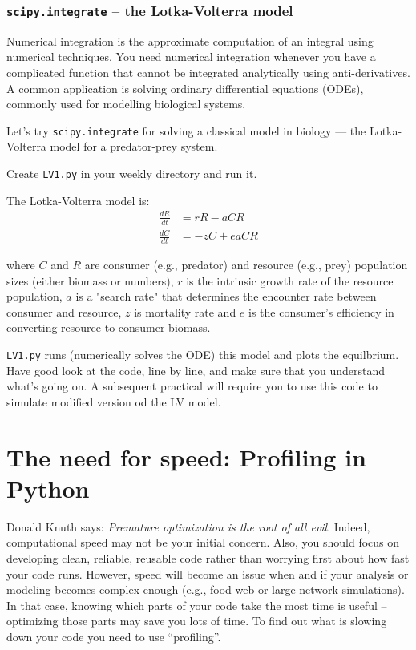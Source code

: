 \subsubsection{{\tt scipy.integrate} -- the Lotka-Volterra model} 
Numerical integration is the approximate computation of an integral 
using numerical techniques. You need numerical integration whenever you 
have a complicated function that cannot be integrated analytically 
using anti-derivatives. A common application is solving ordinary 
differential equations (ODEs), commonly used for modelling biological 
systems.

Let's try {\tt scipy.integrate} for solving a classical model in biology 
--- the Lotka-Volterra model for a predator-prey system. 

\begin{compactitem}[$\quad\star$]\itemsep4pt
	\item Create {\tt LV1.py} in your weekly directory and run it.
\end{compactitem}
 The 
Lotka-Volterra model is: 
\begin{equation}\label{eqn:LVMod}
\begin{aligned}
    \frac{dR}{dt} &= r R - a C R \\
    \frac{dC}{dt} &= - z C + e a C R
\end{aligned}
\end{equation}

where $C$ and $R$ are consumer (e.g., predator) and resource (e.g., 
prey) population sizes (either biomass or numbers), $r$ is the 
intrinsic growth rate of the resource population, $a$ is a "search 
rate" that determines the encounter rate between consumer and resource, 
$z$ is mortality rate and $e$ is the consumer's efficiency in converting 
resource to consumer biomass. 

{\tt LV1.py} runs (numerically solves the ODE) this model and plots the 
equilbrium. Have good look at the code, line by line, and make sure 
that you understand what's going on. A subsequent practical will 
require you to use this code to simulate modified version od the LV 
model.   

\section{The need for speed: Profiling in Python}

Donald Knuth says: {\it Premature optimization is the root of all 
evil}. Indeed, computational speed may not be your initial concern. 
Also, you should focus on developing clean, reliable, reusable code 
rather than worrying first about how fast your code runs. However, 
speed will become an issue when and if your analysis or modeling 
becomes complex enough (e.g., food web or large network simulations). 
In that case, knowing which parts of your code take the most time is 
useful -- optimizing those parts may save you lots of time. To find out 
what is slowing down your code you need to use ``profiling''. 

